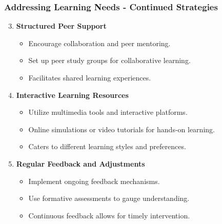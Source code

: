 \documentclass[aspectratio=169]{beamer}
\begin{document}
\begin{frame}[fragile]
    \frametitle{Addressing Learning Needs - Continued Strategies}
    \begin{enumerate}
        \setcounter{enumi}{2} %
        \item \textbf{Structured Peer Support}
            \begin{itemize}
                \item Encourage collaboration and peer mentoring.
                \item Set up peer study groups for collaborative learning.
                \item Facilitates shared learning experiences.
            \end{itemize}

        \item \textbf{Interactive Learning Resources}
            \begin{itemize}
                \item Utilize multimedia tools and interactive platforms.
                \item Online simulations or video tutorials for hands-on learning.
                \item Caters to different learning styles and preferences.
            \end{itemize}

        \item \textbf{Regular Feedback and Adjustments}
            \begin{itemize}
                \item Implement ongoing feedback mechanisms.
                \item Use formative assessments to gauge understanding.
                \item Continuous feedback allows for timely intervention.
            \end{itemize}
    \end{enumerate}
\end{frame}
\end{document}
